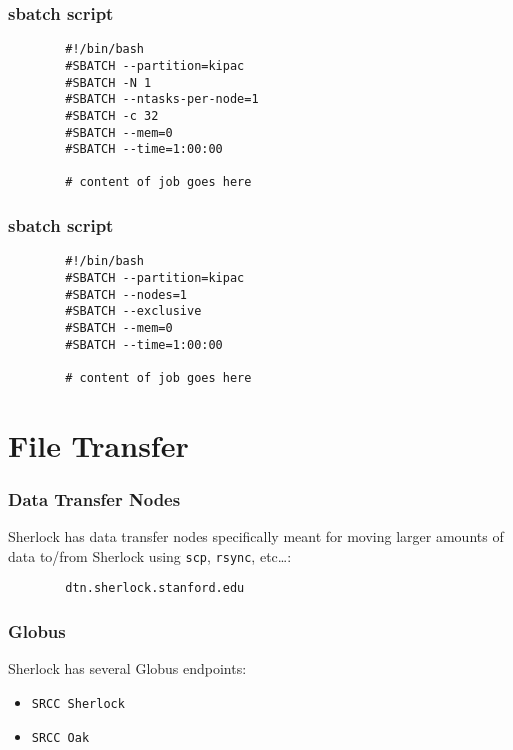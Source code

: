 \documentclass[aspectratio=169]{beamer}
\begin{document}
\begin{frame}[fragile]
	\frametitle{sbatch script}
	\begin{verbatim}
		#!/bin/bash
		#SBATCH --partition=kipac
		#SBATCH -N 1
		#SBATCH --ntasks-per-node=1
		#SBATCH -c 32
		#SBATCH --mem=0
		#SBATCH --time=1:00:00
		
		# content of job goes here
	\end{verbatim}
\end{frame}

\begin{frame}[fragile]
	\frametitle{sbatch script}
	\begin{verbatim}
		#!/bin/bash
		#SBATCH --partition=kipac
		#SBATCH --nodes=1
		#SBATCH --exclusive
		#SBATCH --mem=0
		#SBATCH --time=1:00:00
		
		# content of job goes here
	\end{verbatim}
\end{frame}



\section{File Transfer}

\frame{\sectionpage}

\begin{frame}[fragile]
	\frametitle{Data Transfer Nodes}
	Sherlock has data transfer nodes specifically meant for moving larger amounts of data to/from Sherlock using \texttt{scp}, \texttt{rsync}, etc\ldots:
	\begin{verbatim}
		dtn.sherlock.stanford.edu
	\end{verbatim}
\end{frame}

\begin{frame}
	\frametitle{Globus}
	Sherlock has several Globus endpoints:
	\begin{itemize}
		\item \texttt{SRCC Sherlock}
		\item \texttt{SRCC Oak}
	\end{itemize}
\end{frame}

\end{document}
